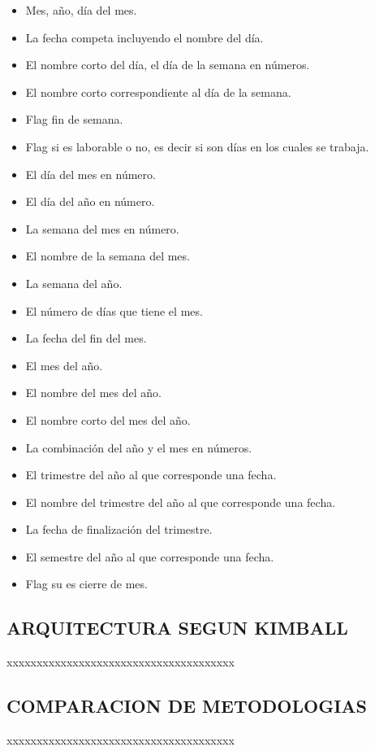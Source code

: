 \documentclass[%
 reprint,
 amsmath,amssymb,
 aps,
]{revtex4-1}
\begin{document}
\begin{itemize}
    \begin{itemize}
	\item Mes, año, día del mes.
	\item La fecha competa incluyendo el nombre del día.
	\item El nombre corto del día, el día de la semana en números.
	\item El nombre corto correspondiente al día de la semana.
	\item Flag fin de semana.
	\item Flag si es laborable o no, es decir si son días en los cuales se trabaja.
	\item El día del mes en número.
	\item El día del año en número.
	\item La semana del mes en número.
	\item El nombre de la semana del mes.
	\item La semana del año.
	\item El número de días que tiene el mes.
	\item La fecha del fin del mes.
	\item El mes del año.
	\item El nombre del mes del año.
	\item El nombre corto del mes del año.
	\item La combinación del año y el mes en números.
	\item El trimestre del año al que corresponde una fecha.
	\item El nombre del trimestre del año al que corresponde una fecha.
	\item La fecha de finalización del trimestre.
	\item El semestre del año al que corresponde una fecha.
	\item Flag su es cierre de mes.
    \end{itemize}
\end{itemize}

\subsection{ARQUITECTURA SEGUN KIMBALL}

xxxxxxxxxxxxxxxxxxxxxxxxxxxxxxxxxxxxxx 


\subsection{COMPARACION DE METODOLOGIAS}	
xxxxxxxxxxxxxxxxxxxxxxxxxxxxxxxxxxxxxx
\end{document}
